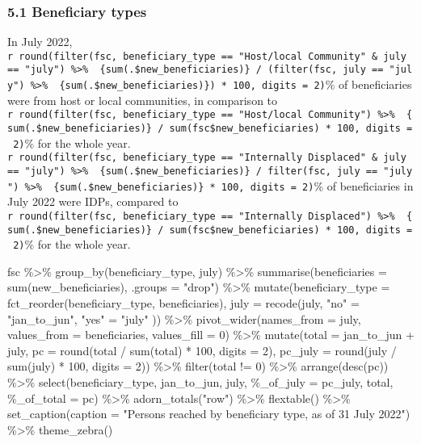 \documentclass[
]{article}
\newenvironment{Shaded}{\begin{snugshade}}{\end{snugshade}}
\newcommand{\NormalTok}[1]{#1}
\begin{document}
\hypertarget{beneficiary-types}{%
\subsubsection{5.1 Beneficiary types}\label{beneficiary-types}}

In July 2022,
\texttt{r\ round(filter(fsc,\ beneficiary\_type\ ==\ "Host/local\ Community"\ \&\ july\ ==\ "july")\ \%\textgreater{}\%\ \ \{sum(.\$new\_beneficiaries)\}\ /\ (filter(fsc,\ july\ ==\ "july")\ \%\textgreater{}\%\ \ \{sum(.\$new\_beneficiaries)\})\ *\ 100,\ digits\ =\ 2)}\%
of beneficiaries were from host or local communities, in comparison to
\texttt{r\ round(filter(fsc,\ beneficiary\_type\ ==\ "Host/local\ Community")\ \%\textgreater{}\%\ \ \{sum(.\$new\_beneficiaries)\}\ /\ sum(fsc\$new\_beneficiaries)\ *\ 100,\ digits\ =\ 2)}\%
for the whole year.
\texttt{r\ round(filter(fsc,\ beneficiary\_type\ ==\ "Internally\ Displaced"\ \&\ july\ ==\ "july")\ \%\textgreater{}\%\ \ \{sum(.\$new\_beneficiaries)\}\ /\ filter(fsc,\ july\ ==\ "july")\ \%\textgreater{}\%\ \ \{sum(.\$new\_beneficiaries)\}\ *\ 100,\ digits\ =\ 2)}\%
of beneficiaries in July 2022 were IDPs, compared to
\texttt{r\ round(filter(fsc,\ beneficiary\_type\ ==\ "Internally\ Displaced")\ \%\textgreater{}\%\ \ \{sum(.\$new\_beneficiaries)\}\ /\ sum(fsc\$new\_beneficiaries)\ *\ 100,\ digits\ =\ 2)}\%
for the whole year.

\begin{Shaded}
\begin{Highlighting}[]
\NormalTok{fsc \%\textgreater{}\% }
\NormalTok{  group\_by(beneficiary\_type, july) \%\textgreater{}\% }
\NormalTok{  summarise(beneficiaries = sum(new\_beneficiaries), }
\NormalTok{            .groups = "drop") \%\textgreater{}\% }
\NormalTok{  mutate(beneficiary\_type = fct\_reorder(beneficiary\_type, beneficiaries),}
\NormalTok{         july = recode(july,}
\NormalTok{                       "no" = "jan\_to\_jun", }
\NormalTok{                      "yes" = "july" )) \%\textgreater{}\% }
\NormalTok{  pivot\_wider(names\_from = july, }
\NormalTok{              values\_from = beneficiaries, }
\NormalTok{              values\_fill = 0) \%\textgreater{}\% }
\NormalTok{  mutate(total = jan\_to\_jun + july, }
\NormalTok{         pc = round(total / sum(total) * 100, }
\NormalTok{                    digits = 2), }
\NormalTok{         pc\_july = round(july / sum(july) * 100, }
\NormalTok{                             digits = 2)) \%\textgreater{}\% }
\NormalTok{  filter(total != 0) \%\textgreater{}\% }
\NormalTok{  arrange(desc(pc)) \%\textgreater{}\% }
\NormalTok{  select(beneficiary\_type, }
\NormalTok{         jan\_to\_jun, july, }
\NormalTok{         \textasciigrave{}\%\_of\_july\textasciigrave{} = pc\_july, }
\NormalTok{         total, }
\NormalTok{         \textasciigrave{}\%\_of\_total\textasciigrave{} = pc) \%\textgreater{}\% }
\NormalTok{  adorn\_totals("row") \%\textgreater{}\% }
\NormalTok{  flextable() \%\textgreater{}\% }
\NormalTok{  set\_caption(caption = "Persons reached by beneficiary type, as of 31 July 2022") \%\textgreater{}\% }
\NormalTok{  theme\_zebra()}
  
\end{Highlighting}
\end{Shaded}
\end{document}
